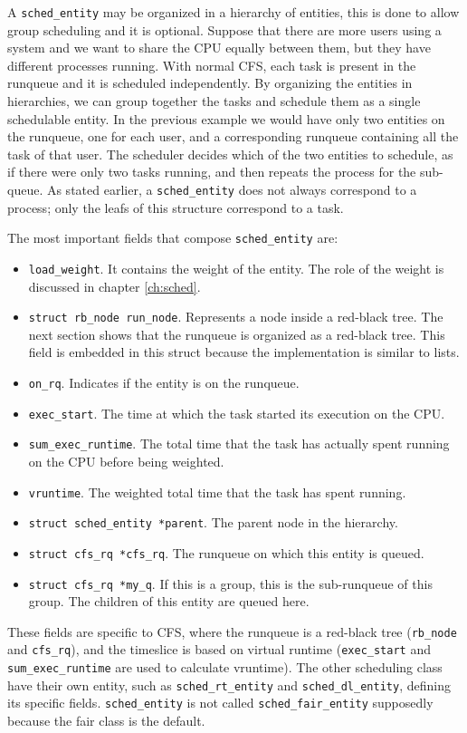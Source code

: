 A \verb|sched_entity| may be organized in a hierarchy of entities, this is done to allow group scheduling and it is optional. Suppose that there are more users using a system and we want to share the CPU equally between them, but they have different processes running. With normal CFS, each task is present in the runqueue and it is scheduled independently. By organizing the entities in hierarchies, we can group together the tasks and schedule them as a single schedulable entity. In the previous example we would have only two entities on the runqueue, one for each user, and a corresponding runqueue containing all the task of that user. The scheduler decides which of the two entities to schedule, as if there were only two tasks running, and then repeats the process for the sub-queue. As stated earlier, a \verb|sched_entity| does not always correspond to a process; only the leafs of this structure correspond to a task. 

The most important fields that compose \verb|sched_entity| are:
\begin{itemize}
    \item \verb|load_weight|. It contains the weight of the entity. The role of the weight is discussed in chapter \ref{ch:sched}.
    \item \verb|struct rb_node run_node|. Represents a node inside a red-black tree. The next section shows that the runqueue is organized as a red-black tree. This field is embedded in this struct because the implementation is similar to lists.
    \item \verb|on_rq|. Indicates if the entity is on the runqueue.
    \item \verb|exec_start|. The time at which the task started its execution on the CPU. %
    \item \verb|sum_exec_runtime|. The total time that the task has actually spent running on the CPU before being weighted.
    \item \verb|vruntime|. The weighted total time that the task has spent running.
    \item \verb|struct sched_entity *parent|. The parent node in the hierarchy.
    \item \verb|struct cfs_rq *cfs_rq|. The runqueue on which this entity is queued.
    \item \verb|struct cfs_rq *my_q|. If this is a group, this is the sub-runqueue of this group. The children of this entity are queued here.
\end{itemize}
These fields are specific to CFS, where the runqueue is a red-black tree (\verb|rb_node| and \verb|cfs_rq|), and the timeslice is based on virtual runtime (\verb|exec_start| and \verb|sum_exec_runtime| are used to calculate vruntime). The other scheduling class have their own entity, such as \verb|sched_rt_entity| and \verb|sched_dl_entity|, defining its specific fields. \verb|sched_entity| is not called \verb|sched_fair_entity| supposedly because the fair class is the default. 

